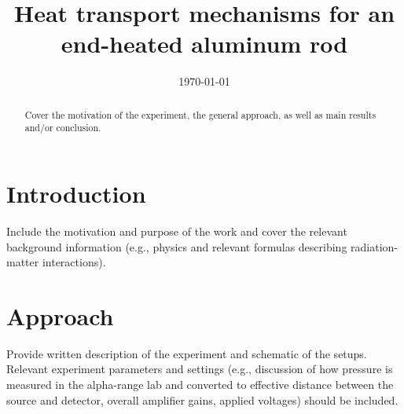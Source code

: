 \documentclass[10pt,aps,prb,twocolumn, nofootinbib]{revtex4-1}
\begin{document}
\title{Heat transport mechanisms for an end-heated aluminum rod}

\date{\today}


\begin{abstract}
 Cover the motivation of the experiment, the general approach, as well as main results and/or conclusion.
\end{abstract}



\maketitle


\section{Introduction}
Include the motivation and purpose of the work and cover the relevant background information (e.g., physics and relevant formulas describing radiation-matter interactions).

\section{Approach}
Provide written description of the experiment and schematic of the setups.  Relevant experiment parameters and settings (e.g., discussion of how pressure is measured in the alpha-range lab and converted to effective distance between the source and detector, overall amplifier gains, applied voltages) should be included.
\end{document}
